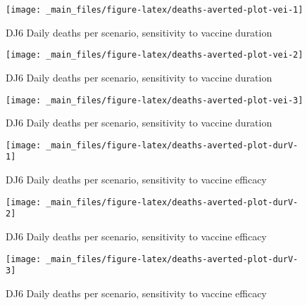 \documentclass{article}
\begin{document}
\begin{figure}

{\centering \texttt{[image: \_main\_files/figure-latex/deaths-averted-plot-vei-1]} 

}

\caption{DJ6 Daily deaths per scenario, sensitivity to vaccine duration}\label{fig:deaths-averted-plot-vei-1}
\end{figure}
\begin{figure}

{\centering \texttt{[image: \_main\_files/figure-latex/deaths-averted-plot-vei-2]} 

}

\caption{DJ6 Daily deaths per scenario, sensitivity to vaccine duration}\label{fig:deaths-averted-plot-vei-2}
\end{figure}
\begin{figure}

{\centering \texttt{[image: \_main\_files/figure-latex/deaths-averted-plot-vei-3]} 

}

\caption{DJ6 Daily deaths per scenario, sensitivity to vaccine duration}\label{fig:deaths-averted-plot-vei-3}
\end{figure}

\begin{figure}

{\centering \texttt{[image: \_main\_files/figure-latex/deaths-averted-plot-durV-1]} 

}

\caption{DJ6 Daily deaths per scenario, sensitivity to vaccine efficacy}\label{fig:deaths-averted-plot-durV-1}
\end{figure}
\begin{figure}

{\centering \texttt{[image: \_main\_files/figure-latex/deaths-averted-plot-durV-2]} 

}

\caption{DJ6 Daily deaths per scenario, sensitivity to vaccine efficacy}\label{fig:deaths-averted-plot-durV-2}
\end{figure}
\begin{figure}

{\centering \texttt{[image: \_main\_files/figure-latex/deaths-averted-plot-durV-3]} 

}

\caption{DJ6 Daily deaths per scenario, sensitivity to vaccine efficacy}\label{fig:deaths-averted-plot-durV-3}
\end{figure}
\end{document}
